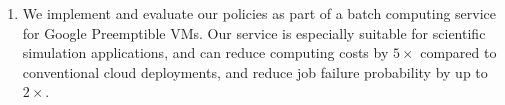 \begin{enumerate} [leftmargin=12pt]
\item We implement and evaluate our policies as part of a batch computing service for Google Preemptible VMs. Our service is especially suitable for scientific simulation applications, and can reduce computing costs by $5\times$ compared to conventional cloud deployments, and reduce job failure probability by up to  $2\times$. 

 
\end{enumerate}







